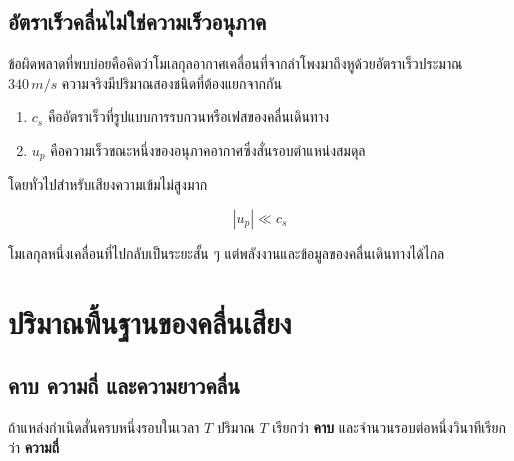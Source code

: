 \begin{center}
\end{center}

\subsection{อัตราเร็วคลื่นไม่ใช่ความเร็วอนุภาค}

ข้อผิดพลาดที่พบบ่อยคือคิดว่าโมเลกุลอากาศเคลื่อนที่จากลำโพงมาถึงหูด้วยอัตราเร็วประมาณ $340\,\si{m/s}$ ความจริงมีปริมาณสองชนิดที่ต้องแยกจากกัน

\begin{enumerate}
    \item $c_s$ คืออัตราเร็วที่รูปแบบการรบกวนหรือเฟสของคลื่นเดินทาง
    \item $u_p$ คือความเร็วขณะหนึ่งของอนุภาคอากาศซึ่งสั่นรอบตำแหน่งสมดุล
\end{enumerate}

โดยทั่วไปสำหรับเสียงความเข้มไม่สูงมาก

\[
|u_p|\ll c_s
\]

โมเลกุลหนึ่งเคลื่อนที่ไปกลับเป็นระยะสั้น ๆ แต่พลังงานและข้อมูลของคลื่นเดินทางได้ไกล

\section{ปริมาณพื้นฐานของคลื่นเสียง}

\subsection{คาบ ความถี่ และความยาวคลื่น}

ถ้าแหล่งกำเนิดสั่นครบหนึ่งรอบในเวลา $T$ ปริมาณ $T$ เรียกว่า \textbf{คาบ} และจำนวนรอบต่อหนึ่งวินาทีเรียกว่า \textbf{ความถี่}

